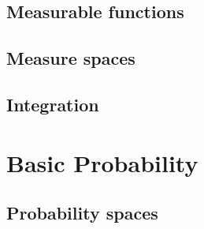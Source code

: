 \documentclass[a4paper]{amsart}
\begin{document}
\subsection{Measurable functions}

\subsection{Measure spaces}

\subsection{Integration}

\section{Basic Probability}

\subsection{Probability spaces}
\end{document}
